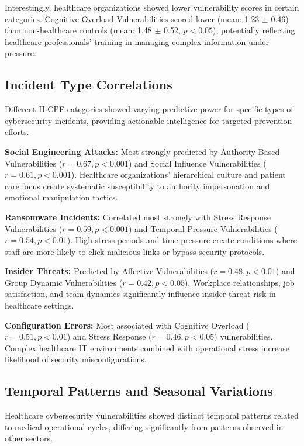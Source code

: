 \documentclass[10pt, twocolumn]{article}
\begin{document}
Interestingly, healthcare organizations showed lower vulnerability scores in certain categories. Cognitive Overload Vulnerabilities scored lower (mean: 1.23 $\pm$ 0.46) than non-healthcare controls (mean: 1.48 $\pm$ 0.52, $p < 0.05$), potentially reflecting healthcare professionals' training in managing complex information under pressure.

\subsection{Incident Type Correlations}

Different H-CPF categories showed varying predictive power for specific types of cybersecurity incidents, providing actionable intelligence for targeted prevention efforts.

\textbf{Social Engineering Attacks:} Most strongly predicted by Authority-Based Vulnerabilities ($r = 0.67, p < 0.001$) and Social Influence Vulnerabilities ($r = 0.61, p < 0.001$). Healthcare organizations' hierarchical culture and patient care focus create systematic susceptibility to authority impersonation and emotional manipulation tactics.

\textbf{Ransomware Incidents:} Correlated most strongly with Stress Response Vulnerabilities ($r = 0.59, p < 0.001$) and Temporal Pressure Vulnerabilities ($r = 0.54, p < 0.01$). High-stress periods and time pressure create conditions where staff are more likely to click malicious links or bypass security protocols.

\textbf{Insider Threats:} Predicted by Affective Vulnerabilities ($r = 0.48, p < 0.01$) and Group Dynamic Vulnerabilities ($r = 0.42, p < 0.05$). Workplace relationships, job satisfaction, and team dynamics significantly influence insider threat risk in healthcare settings.

\textbf{Configuration Errors:} Most associated with Cognitive Overload ($r = 0.51, p < 0.01$) and Stress Response ($r = 0.46, p < 0.05$) vulnerabilities. Complex healthcare IT environments combined with operational stress increase likelihood of security misconfigurations.

\subsection{Temporal Patterns and Seasonal Variations}

Healthcare cybersecurity vulnerabilities showed distinct temporal patterns related to medical operational cycles, differing significantly from patterns observed in other sectors.
\end{document}
